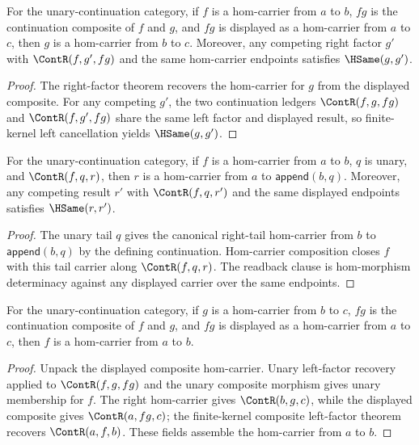 \begin{theorem}
\label{thm:category-hom-carrier-comp-right-factor-public-readback}
For the unary-continuation category, if $f$ is a hom-carrier from $a$ to $b$,
$fg$ is the continuation composite of $f$ and $g$, and $fg$ is displayed as a
hom-carrier from $a$ to $c$, then $g$ is a hom-carrier from $b$ to $c$.
Moreover, any competing right factor $g'$ with $\ContR(f,g',fg)$ and the same
hom-carrier endpoints satisfies $\HSame(g,g')$.
\end{theorem}
\begin{proof}
The right-factor theorem recovers the hom-carrier for $g$ from the displayed
composite. For any competing $g'$, the two continuation ledgers
$\ContR(f,g,fg)$ and $\ContR(f,g',fg)$ share the same left factor and displayed
result, so finite-kernel left cancellation yields $\HSame(g,g')$.
\end{proof}

\begin{theorem}
\label{thm:category-hom-carrier-right-unary-tail-comp-public-readback}
For the unary-continuation category, if $f$ is a hom-carrier from $a$ to
$b$, $q$ is unary, and $\ContR(f,q,r)$, then $r$ is a hom-carrier from $a$
to $\mathsf{append}(b,q)$. Moreover, any competing result $r'$ with
$\ContR(f,q,r')$ and the same displayed endpoints satisfies $\HSame(r,r')$.
\end{theorem}
\begin{proof}
The unary tail $q$ gives the canonical right-tail hom-carrier from $b$ to
$\mathsf{append}(b,q)$ by the defining continuation. Hom-carrier composition
closes $f$ with this tail carrier along $\ContR(f,q,r)$. The readback clause is
hom-morphism determinacy against any displayed carrier over the same endpoints.
\end{proof}

\begin{theorem}
\label{thm:category-hom-carrier-comp-left-factor}
For the unary-continuation category, if \(g\) is a hom-carrier from \(b\) to
\(c\), \(fg\) is the continuation composite of \(f\) and \(g\), and \(fg\) is
displayed as a hom-carrier from \(a\) to \(c\), then \(f\) is a hom-carrier
from \(a\) to \(b\).
\end{theorem}
\begin{proof}
Unpack the displayed composite hom-carrier. Unary left-factor recovery applied
to \(\ContR(f,g,fg)\) and the unary composite morphism gives unary membership
for \(f\). The right hom-carrier gives \(\ContR(b,g,c)\), while the displayed
composite gives \(\ContR(a,fg,c)\); the finite-kernel composite left-factor
theorem recovers \(\ContR(a,f,b)\). These fields assemble the hom-carrier from
\(a\) to \(b\).
\end{proof}

